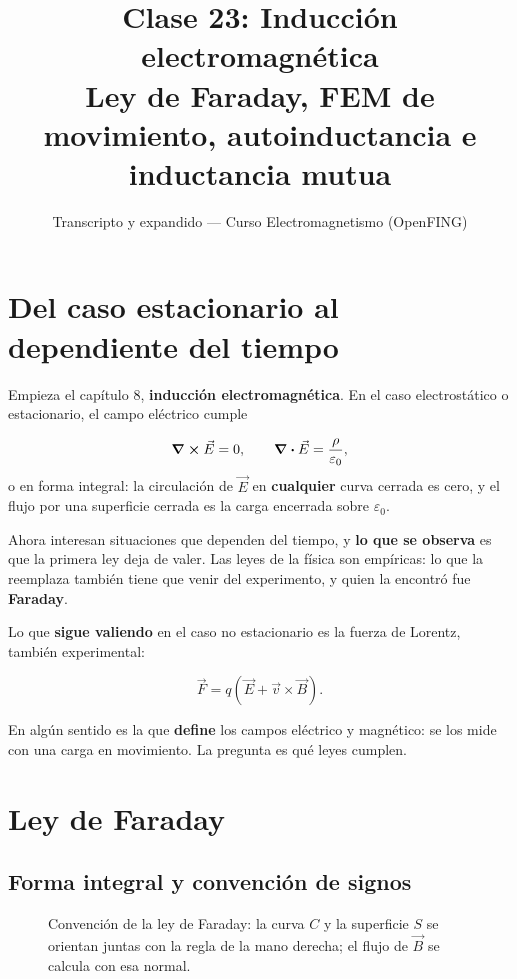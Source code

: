 \documentclass[12pt,a4paper]{article}
\title{\textbf{Clase 23: Inducción electromagnética} \\[0.3em]
        \large{Ley de Faraday, FEM de movimiento, autoinductancia e inductancia mutua}}
\author{Transcripto y expandido --- Curso Electromagnetismo (OpenFING)}
\date{}
\begin{document}
\maketitle
\thispagestyle{empty}
\newpage

\tableofcontents
\newpage

\section{Del caso estacionario al dependiente del tiempo}

Empieza el capítulo 8, \textbf{inducción electromagnética}. En el caso
electrostático o estacionario, el campo eléctrico cumple

\[
\curl\vec E = 0, \qquad \div\vec E = \frac{\rho}{\varepsilon_0},
\]
o en forma integral: la circulación de $\vec E$ en \textbf{cualquier} curva cerrada
es cero, y el flujo por una superficie cerrada es la carga encerrada sobre
$\varepsilon_0$.

Ahora interesan situaciones que dependen del tiempo, y \textbf{lo que se observa} es
que la primera ley deja de valer. Las leyes de la física son empíricas: lo que
la reemplaza también tiene que venir del experimento, y quien la encontró fue
\textbf{Faraday}.

Lo que \textbf{sigue valiendo} en el caso no estacionario es la fuerza de Lorentz,
también experimental:

\[
\vec F = q\left(\vec E + \vec v\times\vec B\right).
\]

En algún sentido es la que \textbf{define} los campos eléctrico y magnético: se los
mide con una carga en movimiento. La pregunta es qué leyes cumplen.

\section{Ley de Faraday}

\subsection{Forma integral y convención de signos}

\begin{figure}[H]
  \centering
  
  \caption{Convención de la ley de Faraday: la curva $C$ y la superficie $S$ se orientan juntas con la regla de la mano derecha; el flujo de $\vec B$ se calcula con esa normal.}
\end{figure}
\end{document}

